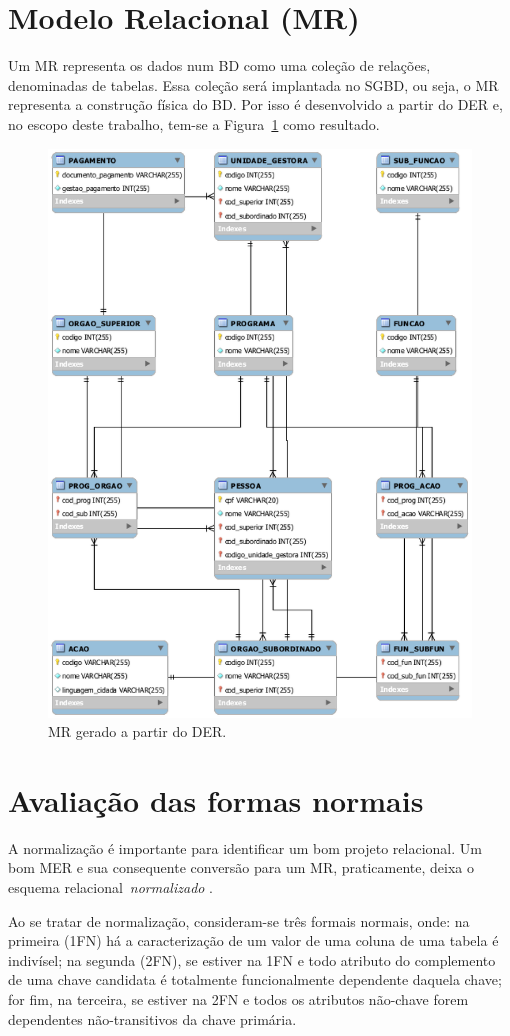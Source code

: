 \documentclass [12pt]{article}
\begin{document}
	
	\section{Modelo Relacional (MR)}
		\label{sec:MR}
	Um MR representa os dados num BD como uma coleção de relações, denominadas de tabelas. Essa coleção será implantada no SGBD, ou seja, o MR representa a construção física do BD. Por isso é desenvolvido a partir do DER e, no escopo deste trabalho, tem-se a Figura~\ref{fig:MRgerado} como resultado.
	
	\begin{figure}[h]
		\centering
		\includegraphics[width=.8\textwidth]{Imagens/MR}
		\caption{MR gerado a partir do DER.}
		\label{fig:MRgerado}
	\end{figure}
	
	\section{Avaliação das formas normais}
		\label{sec:FormaisNormais}
	A normalização é importante para identificar um bom projeto relacional. Um bom MER e sua consequente conversão para um MR, praticamente, deixa o esquema relacional~\emph{normalizado}	.
	
	Ao se tratar de normalização, consideram-se três formais normais, onde: na primeira (1FN) há a caracterização de um valor de uma coluna de uma tabela é indivísel; na segunda (2FN), se estiver na 1FN e todo atributo do complemento de uma chave candidata é totalmente funcionalmente dependente daquela chave; for fim, na terceira, se estiver na 2FN e todos os atributos não-chave forem dependentes não-transitivos da chave primária.
	
\end{document}
